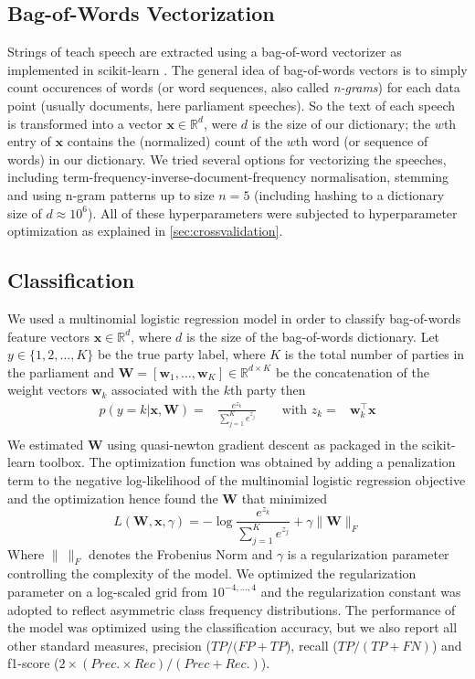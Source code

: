 \documentclass{article} %
\renewcommand{\vec}[1]{\mathbf{#1}}
\newcommand{\R}{\ensuremath{\mathds{R}}}
\begin{document}
\subsection{Bag-of-Words Vectorization}\label{sec:bow-vectorization}
Strings of teach speech are extracted using a bag-of-word vectorizer as implemented in scikit-learn \cite{scikit-learn}. The general idea of bag-of-words vectors is to simply count occurences of words (or word sequences, also called {\em n-grams}) for each data point (usually documents, here parliament speeches). So the text of each speech is transformed into a vector $\vec{x}\in\mathds{R}^d$, were $d$ is the size of our dictionary; the $w$th entry of $\vec{x}$ contains the (normalized) count of the $w$th word (or sequence of words) in our dictionary. We tried several options for vectorizing the speeches, including term-frequency-inverse-document-frequency normalisation, stemming and using n-gram patterns up to size $n=5$ (including hashing to a dictionary size of $d\approx10^6$). All of these hyperparameters were subjected to hyperparameter optimization as explained in \autoref{sec:crossvalidation}. 

\subsection{Classification}
We used a multinomial logistic regression model in order to classify bag-of-words feature vectors $\vec{x}\in\R^d$, where $d$ is the size of the bag-of-words dictionary. Let $y\in\{1,2,\dots,K\}$ be the true party label, where $K$ is the total number of parties in the parliament and $\vec{W}=[\vec{w}_1,\dots,\vec{w}_K]\in\R^{d\times K}$ be the concatenation of the weight vectors $\vec{w}_k$ associated with the $k$th party then 
\begin{eqnarray}\label{eq:logreg_multiclass}
p(y=k|\vec{x},\vec{W}) = &\frac{e^{z_k}}{\sum_{j=1}^K e^{z_j}} \qquad \textrm{with }  z_k=&\vec{w}_k^{\top}\vec{x} \\\nonumber
\end{eqnarray}
%
We estimated $\vec{W}$ using quasi-newton gradient descent as packaged in the scikit-learn toolbox. The optimization function was obtained by adding a penalization term to the negative log-likelihood of the multinomial logistic regression objective and the optimization hence found the $\vec{W}$ that minimized
\begin{equation}\label{eq:objective}
L(\vec{W}, \vec{x}, \gamma) = - \log{\frac{e^{z_k}}{\sum_{j=1}^K e^{z_j}}}+ \gamma \| \vec{W} \|_{F}
\end{equation}
Where $\|~\|_F$ denotes the Frobenius Norm and $\gamma$ is a regularization parameter controlling the complexity of the model. 
 We optimized the regularization parameter on a log-scaled grid from $10^{-4,\dots,4}$ and the regularization constant was adopted to reflect asymmetric class frequency distributions. The performance of the model was optimized using the classification accuracy, but we also report all other standard measures, precision ($TP / (FP + TP$), recall ($TP / (TP + FN)$) and f1-score ($2\times (Prec. \times Rec) / (Prec + Rec.)$). 
\end{document}

